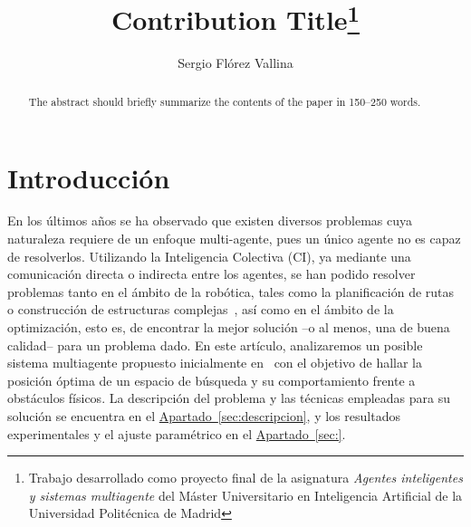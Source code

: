 \documentclass[runningheads]{llncs}
\newcommand{\refcruzada}[2]{\hyperref[#2]{#1~\ref{#2}}}
\begin{document}
    \title{Contribution Title\thanks{Trabajo desarrollado como proyecto final de la asignatura \textit{Agentes inteligentes y sistemas multiagente} del Máster Universitario en Inteligencia Artificial de la Universidad Politécnica de Madrid}}
    \author{Sergio Flórez Vallina}

    \maketitle              %
    \begin{abstract}
        The abstract should briefly summarize the contents of the paper in
        150--250 words.

    \end{abstract}

    \section{Introducción}
    En los últimos años se ha observado que existen diversos problemas cuya naturaleza requiere de un enfoque
    multi-agente, pues un único agente no es capaz de resolverlos.
    Utilizando la Inteligencia Colectiva (CI), ya mediante una comunicación directa o indirecta entre los agentes,
    se han podido resolver problemas tanto en el ámbito de la robótica, tales como la planificación de rutas o
    construcción de estructuras complejas~\cite{collectiveConstruction}, así como en el ámbito de la optimización,
    esto es, de encontrar la mejor solución --o al menos, una de buena calidad-- para un problema dado.
    En este artículo, analizaremos un posible sistema multiagente propuesto inicialmente en~\cite{initialPaper}
    con el objetivo de hallar la posición óptima de un espacio de búsqueda y su comportamiento frente a obstáculos físicos.
    La descripción del problema y las técnicas empleadas para su solución se encuentra en el
    \refcruzada{Apartado}{sec:descripcion}, y los resultados experimentales y el ajuste paramétrico en
    el \refcruzada{Apartado}{sec:}. %
\end{document}
